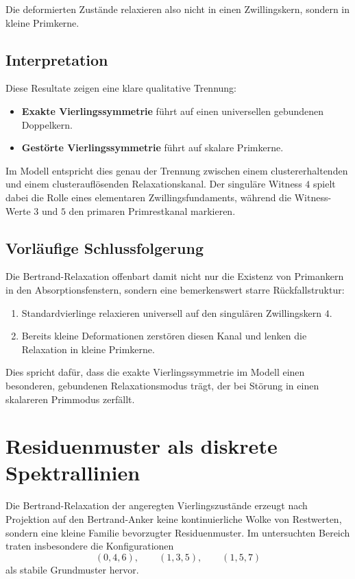 \documentclass[11pt,a4paper]{article}
\theoremstyle{definition}
\theoremstyle{plain}
\theoremstyle{remark}
\begin{document}
	Die deformierten Zustände relaxieren also nicht in einen Zwillingskern, sondern in kleine Primkerne.
	
	\subsection{Interpretation}
	
	Diese Resultate zeigen eine klare qualitative Trennung:
	
	\begin{itemize}
		\item \textbf{Exakte Vierlingssymmetrie} führt auf einen universellen gebundenen Doppelkern.
		\item \textbf{Gestörte Vierlingssymmetrie} führt auf skalare Primkerne.
	\end{itemize}
	
	Im Modell entspricht dies genau der Trennung zwischen einem clustererhaltenden und einem clusterauflösenden Relaxationskanal. 
	Der singuläre Witness \(4\) spielt dabei die Rolle eines elementaren Zwillingsfundaments, während die Witness-Werte \(3\) und \(5\) den primaren Primrestkanal markieren.
	
	\subsection{Vorläufige Schlussfolgerung}
	
	Die Bertrand-Relaxation offenbart damit nicht nur die Existenz von Primankern in den Absorptionsfenstern, sondern eine bemerkenswert starre Rückfallstruktur:
	
	\begin{enumerate}
		\item Standardvierlinge relaxieren universell auf den singulären Zwillingskern \(4\).
		\item Bereits kleine Deformationen zerstören diesen Kanal und lenken die Relaxation in kleine Primkerne.
	\end{enumerate}
	
	Dies spricht dafür, dass die exakte Vierlingssymmetrie im Modell einen besonderen, gebundenen Relaxationsmodus trägt, der bei Störung in einen skalareren Primmodus zerfällt.
	
	\section{Residuenmuster als diskrete Spektrallinien}
	
	Die Bertrand-Relaxation der angeregten Vierlingszustände erzeugt nach Projektion auf den Bertrand-Anker keine kontinuierliche Wolke von Restwerten, sondern eine kleine Familie bevorzugter Residuenmuster. 
	Im untersuchten Bereich traten insbesondere die Konfigurationen
	\[
	(0,4,6),\qquad (1,3,5),\qquad (1,5,7)
	\]
	als stabile Grundmuster hervor.
	
\end{document}
